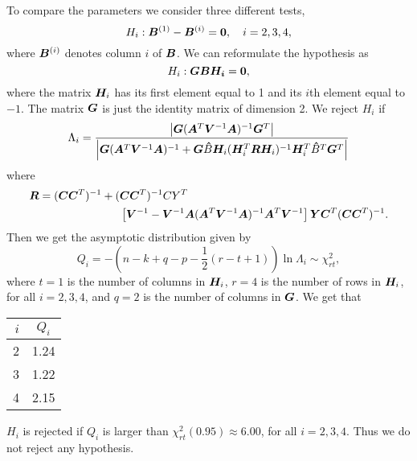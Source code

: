 To compare the parameters we consider three different tests,
\begin{equation*}
  H_i: \bm{B}^{(1)} - \bm{B}^{(i)} = \bm{0},\quad i = 2,3,4,
\end{equation*}
where $\bm{B}^{(i)}$ denotes column $i$ of $\bm{B}$. We can reformulate the
hypothesis as
\begin{equation*}
  H_i: \bm{G B H_i} = \bm{0}, 
\end{equation*}
where the matrix $\bm{H}_i$ has its first element equal to 1 and its $i$th element
equal to $-1$. The matrix $\bm{G}$ is just the identity matrix of
dimension 2. We reject $H_{i}$ if 
\begin{equation*}
  \Lambda_{i} = \frac{\left| \bm{G} (\bm{A}^{T} \bm{V}^{-1} \bm{A})^{-1}\bm{G}^{T} \right|}
  {\left| \bm{G} (\bm{A}^{T} \bm{V}^{-1} \bm{A})^{-1} + \bm{G} \bm{\hat} B\bm{H}_{i}(\bm{H}_{i}^{T} \bm{R} \bm{H}_{i})^{-1}\bm{H}_{i}^{T} \bm{\hat} B^{T} \bm{G}^{T} \right|}
\end{equation*}
where
\begin{align*}
  \bm{R} = (\bm{C} \bm{C}^{T})^{-1} + ( &\bm{C} \bm{C}^{T})^{-1} CY^{T} \\
 &  \left[
    \bm{V}^{-1}  - \bm{V}^{-1}\bm{A}(\bm{A}^{T} \bm{V}^{-1} \bm{A})^{-1}\bm{A}^{T} \bm{V}^{-1}
  \right]
  \bm{Y} \bm{C}^{T}(\bm{C} \bm{C}^{T})^{-1}.
\end{align*}
Then we get the  asymptotic distribution given by
\begin{equation*}
 Q_{i} = - (n - k + q - p - \frac{1}{2}(r - t + 1)) \ln \Lambda_{i} \sim \chi^{2}_{rt}, 
\end{equation*}
where $t=1$ is the number of columns in $\bm{H}_{i}$, $r = 4$ is the
number of rows in $\bm{H}_{i}$, for all $i = 2,3,
4$, and $q = 2$ is the number of columns in $\bm{G}$. We get that
\begin{center}
  \begin{tabular}{r|c}
    $i$   & $Q_{i}$   \\ \hline
    2   & 1.24 \\
    3   & 1.22 \\
    4   & 2.15 \\
  \end{tabular}
\end{center}
$H_{i}$ is rejected  if $Q_{i}$ is larger than
$\chi^{2}_{rt}(0.95) \approx 6.00$, for all $i = 2,3,4$. Thus we do not reject any hypothesis. 
